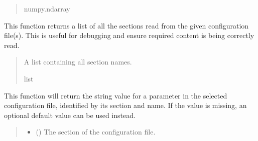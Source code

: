 \documentclass[letterpaper,10pt,english]{sphinxmanual}
\begin{document}
\begin{fulllineitems}
\begin{fulllineitems}
\begin{quote}
\begin{description}
\sphinxAtStartPar
numpy.ndarray

\end{description}\end{quote}

\end{fulllineitems}


\begin{fulllineitems}
\label{\detokenize{modules/input/config_handler:qnav.input.config_handler.ConfigHandler.get_sections}}
\pysigstartsignatures
{}
\pysigstopsignatures
\sphinxAtStartPar
This function returns a list of all the sections read from the given
configuration file(s). This is useful for debugging and ensure
required content is being correctly read.
\begin{quote}\begin{description}
\sphinxAtStartPar
A list containing all section names.

\sphinxAtStartPar
list

\end{description}\end{quote}

\end{fulllineitems}


\begin{fulllineitems}
\label{\detokenize{modules/input/config_handler:qnav.input.config_handler.ConfigHandler.get_str}}
\pysigstartsignatures
{}
\pysigstopsignatures
\sphinxAtStartPar
This function will return the string value for a parameter in the
selected configuration file, identified by its section and name. If
the value is missing, an optional default value can be used instead.
\begin{quote}\begin{description}
\begin{itemize}
\item {} 
\sphinxAtStartPar
{} () \textendash{} The section of the configuration file.


\end{itemize}
\end{description}
\end{quote}
\end{fulllineitems}
\end{fulllineitems}
\end{document}
